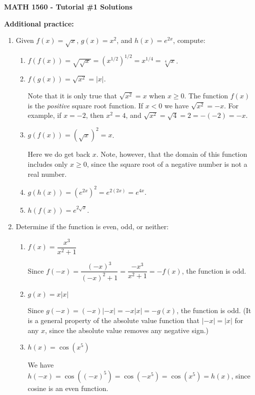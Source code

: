 \documentclass[12pt]{article}
\newcommand{\abs}[1]{\lvert #1\rvert}
\begin{document}
\author{Instructor: Sean Fitzpatrick}
\thispagestyle{empty}
\begin{center}

{\bf MATH 1560 - Tutorial \#1 Solutions}\\

\end{center}



\textbf{Additional practice:}
\begin{enumerate}
\item Given $f(x)=\sqrt{x}$, $g(x)=x^2$, and $h(x)=e^{2x}$, compute:
\begin{enumerate}
\item $f(f(x)) = \sqrt{\sqrt{x}}=(x^{1/2})^{1/2} = x^{1/4} = \sqrt[4]{x}$.
\item $f(g(x)) = \sqrt{x^2} = \abs{x}$.

Note that it is only true that $\sqrt{x^2}=x$ when $x\geq 0$. The function $f(x)$ is the \textit{positive} square root function. If $x<0$ we have $\sqrt{x^2}=-x$. For example, if $x=-2$, then $x^2=4$, and $\sqrt{x^2} = \sqrt{4} = 2 = -(-2) = -x$.
\item $g(f(x)) = (\sqrt{x})^2 = x$.

Here we do get back $x$. Note, however, that the domain of this function includes only $x\geq 0$, since the square root of a negative number is not a real number.
\item $g(h(x)) = (e^{2x})^2 = e^{2(2x)}=e^{4x}$.
\item $h(f(x)) = e^{2\sqrt{x}}$.
\end{enumerate}


\item Determine if the function is even, odd, or neither:

\begin{enumerate}
\item $f(x) = \dfrac{x^3}{x^2+1}$

Since $f(-x) = \dfrac{(-x)^3}{(-x)^2+1} = \dfrac{-x^3}{x^2+1} = -f(x)$, the function is odd.

\item $g(x) = x\abs{x}$

Since $g(-x) = (-x)\abs{-x} = -x\abs{x} = -g(x)$, the function is odd. (It is a general property of the absolute value function that $\abs{-x}=\abs{x}$ for any $x$, since the absolute value removes any negative sign.)

\item $h(x) = \cos(x^5)$

We have $h(-x)=\cos((-x)^5) = \cos(-x^5) = \cos(x^5)=h(x)$, since cosine is an even function.
\end{enumerate}

\end{enumerate}
\end{document}
